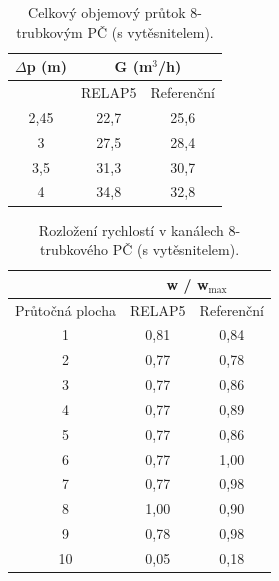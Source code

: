\begin{table}[H]
\end{table}



\begin{table}[H]
	\centering
	\caption{Celkový objemový průtok 8-trubkovým PČ (s vytěsnitelem).}
	\label{tab:celkovy_prutok_vodni_sloupec}
	\begin{tabular}{ccc}
		\hline
		$ \Delta  $p (m) & \multicolumn{2}{c}{\textbf{G} (m$ ^3 $/h)} \\ \hline
		& RELAP5 & Referenční \\ 
		\hline \hline
		2,45 & 22,7 & 25,6 \\
		3 & 27,5 & 28,4 \\
		3,5 & 31,3 & 30,7 \\
		4 & 34,8 & 32,8 \\ \hline
		
	\end{tabular}
	
\end{table}
\begin{table}[H]
	\centering
	\caption{Rozložení rychlostí v kanálech 8-trubkového PČ (s vytěsnitelem).}
	\label{tab:rel_rychlosti}
	\begin{tabular}{ccc}
		\hline
		& \multicolumn{2}{c}{\textbf{w }/ \textbf{w}$_{\text{max}} $} \\ \hline
		Průtočná plocha & RELAP5      & Referenční \\ \hline \hline
		1               & 0,81            & 0,84       \\
		2               & 0,77            & 0,78       \\
		3               & 0,77            & 0,86       \\
		4               & 0,77            & 0,89       \\
		5               & 0,77            & 0,86       \\
		6               & 0,77            & 1,00       \\
		7               & 0,77            & 0,98       \\
		8               & 1,00            & 0,90       \\
		9               & 0,78            & 0,98       \\
		10              & 0,05            & 0,18		\\ \hline      
	\end{tabular}
	
\end{table}
